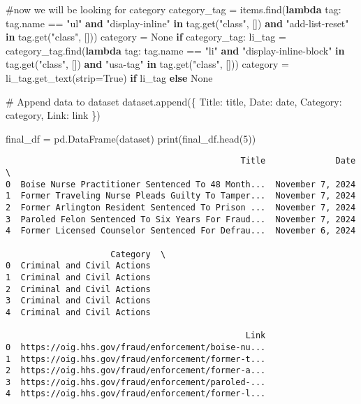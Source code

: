 \documentclass[
  letterpaper,
  DIV=11,
  numbers=noendperiod]{scrartcl}
\newenvironment{Shaded}{\begin{snugshade}}{\end{snugshade}}
\newcommand{\BuiltInTok}[1]{\textcolor[rgb]{0.00,0.23,0.31}{#1}}
\newcommand{\CommentTok}[1]{\textcolor[rgb]{0.37,0.37,0.37}{#1}}
\newcommand{\ControlFlowTok}[1]{\textcolor[rgb]{0.00,0.23,0.31}{\textbf{#1}}}
\newcommand{\DecValTok}[1]{\textcolor[rgb]{0.68,0.00,0.00}{#1}}
\newcommand{\KeywordTok}[1]{\textcolor[rgb]{0.00,0.23,0.31}{\textbf{#1}}}
\newcommand{\NormalTok}[1]{\textcolor[rgb]{0.00,0.23,0.31}{#1}}
\newcommand{\OperatorTok}[1]{\textcolor[rgb]{0.37,0.37,0.37}{#1}}
\newcommand{\StringTok}[1]{\textcolor[rgb]{0.13,0.47,0.30}{#1}}
\newcommand{\VariableTok}[1]{\textcolor[rgb]{0.07,0.07,0.07}{#1}}
\begin{document}
\begin{Shaded}
\begin{Highlighting}[]
    \CommentTok{\#now we will be looking for category}
\NormalTok{    category\_tag }\OperatorTok{=}\NormalTok{ items.find(}\KeywordTok{lambda}\NormalTok{ tag: tag.name }\OperatorTok{==} \StringTok{"ul"} \KeywordTok{and} \StringTok{"display{-}inline"} \KeywordTok{in}\NormalTok{ tag.get(}\StringTok{"class"}\NormalTok{, []) }\KeywordTok{and} \StringTok{"add{-}list{-}reset"} \KeywordTok{in}\NormalTok{ tag.get(}\StringTok{"class"}\NormalTok{, []))}
\NormalTok{    category }\OperatorTok{=} \VariableTok{None}
    \ControlFlowTok{if}\NormalTok{ category\_tag:}
\NormalTok{        li\_tag }\OperatorTok{=}\NormalTok{ category\_tag.find(}\KeywordTok{lambda}\NormalTok{ tag: tag.name }\OperatorTok{==} \StringTok{"li"} \KeywordTok{and} \StringTok{"display{-}inline{-}block"} \KeywordTok{in}\NormalTok{ tag.get(}\StringTok{"class"}\NormalTok{, []) }\KeywordTok{and} \StringTok{"usa{-}tag"} \KeywordTok{in}\NormalTok{ tag.get(}\StringTok{"class"}\NormalTok{, []))}
\NormalTok{        category }\OperatorTok{=}\NormalTok{ li\_tag.get\_text(strip}\OperatorTok{=}\VariableTok{True}\NormalTok{) }\ControlFlowTok{if}\NormalTok{ li\_tag }\ControlFlowTok{else} \VariableTok{None}

    \CommentTok{\# Append data to dataset}
\NormalTok{    dataset.append(\{}
        \StringTok{\textquotesingle{}Title\textquotesingle{}}\NormalTok{: title, }
        \StringTok{\textquotesingle{}Date\textquotesingle{}}\NormalTok{: date, }
        \StringTok{\textquotesingle{}Category\textquotesingle{}}\NormalTok{: category, }
        \StringTok{\textquotesingle{}Link\textquotesingle{}}\NormalTok{: link }
\NormalTok{    \})}

\NormalTok{final\_df }\OperatorTok{=}\NormalTok{ pd.DataFrame(dataset)}
\BuiltInTok{print}\NormalTok{(final\_df.head(}\DecValTok{5}\NormalTok{))}
\end{Highlighting}
\end{Shaded}

\begin{verbatim}
                                               Title              Date  \
0  Boise Nurse Practitioner Sentenced To 48 Month...  November 7, 2024   
1  Former Traveling Nurse Pleads Guilty To Tamper...  November 7, 2024   
2  Former Arlington Resident Sentenced To Prison ...  November 7, 2024   
3  Paroled Felon Sentenced To Six Years For Fraud...  November 7, 2024   
4  Former Licensed Counselor Sentenced For Defrau...  November 6, 2024   

                     Category  \
0  Criminal and Civil Actions   
1  Criminal and Civil Actions   
2  Criminal and Civil Actions   
3  Criminal and Civil Actions   
4  Criminal and Civil Actions   

                                                Link  
0  https://oig.hhs.gov/fraud/enforcement/boise-nu...  
1  https://oig.hhs.gov/fraud/enforcement/former-t...  
2  https://oig.hhs.gov/fraud/enforcement/former-a...  
3  https://oig.hhs.gov/fraud/enforcement/paroled-...  
4  https://oig.hhs.gov/fraud/enforcement/former-l...  
\end{verbatim}
\end{document}
